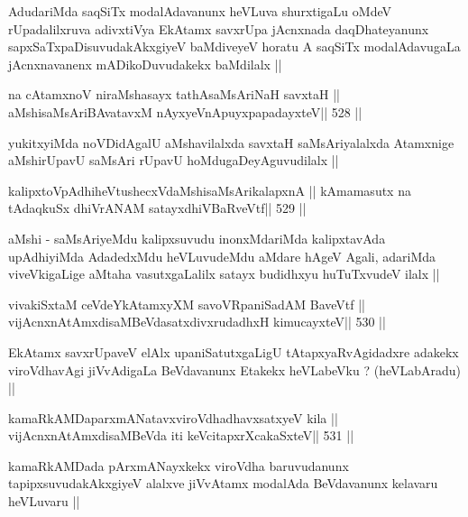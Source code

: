 \begin{artha}
AdudariMda saqSiTx modalAdavanunx heVLuva shurxtigaLu oMdeV
rUpadalilxruva adivxtiVya EkAtamx savxrUpa jAcnxnada daqDhateyanunx
sapxSaTxpaDisuvudakAkxgiyeV baMdiveyeV horatu A saqSiTx modalAdavugaLa
jAcnxnavanenx mADikoDuvudakekx baMdilalx ||
\end{artha}


\begin{shl}
na cA\s\s tamxnoV niraMshasayx tathA\s saMsAriNaH savxtaH ||
aMshisaMsAriBAvatavxM nAyxyeVnApuyxpapadayxteV\hfill || 528 ||
\end{shl}

\begin{artha}
yukitxyiMda noVDidAgalU aMshavilalxda savxtaH saMsAriyalalxda
Atamxnige aMshirUpavU saMsAri rUpavU hoMdugaDeyAguvudilalx ||
\end{artha}

\begin{shl}
kalipxtoVpAdhiheVtushecxVdaMshisaMsArikalapxnA ||
kAmamasutx na tAdaqkuSx dhiVrANAM satayxdhiVBaRveVtf\hfill || 529 ||
\end{shl}

\begin{artha}
aMshi - saMsAriyeMdu kalipxsuvudu inonxMdariMda kalipxtavAda
upAdhiyiMda AdadedxMdu heVLuvudeMdu aMdare hAgeV Agali, adariMda
viveVkigaLige aMtaha vasutxgaLalilx satayx budidhxyu huTuTxvudeV ilalx ||
\end{artha}

\begin{shl}
vivakiSxtaM ceVdeYkAtamxyXM savoVRpaniSadAM BaveVtf ||
vijAcnxnAtAmxdisaMBeVdasatxdivxrudadhxH kimucayxteV\hfill || 530 ||
\end{shl}

\begin{artha}
EkAtamx savxrUpaveV elAlx upaniSatutxgaLigU tAtapxyaRvAgidadxre
adakekx viroVdhavAgi jiVvAdigaLa BeVdavanunx Etakekx heVLabeVku ?
(heVLabAradu) ||
\end{artha}


\begin{shl}
kamaRkAMDaparxmANatavxviroVdhadhavxsatxyeV kila ||
vijAcnxnAtAmxdisaMBeVda iti keVcitapxrXcakaSxteV\hfill || 531 ||
\end{shl}

\begin{artha}
kamaRkAMDada pArxmANayxkekx viroVdha baruvudanunx tapipxsuvudakAkxgiyeV
alalxve jiVvAtamx modalAda BeVdavanunx kelavaru heVLuvaru ||
\end{artha}

